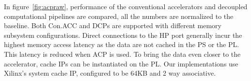 In figure~\ref{fig:acpraw}, performance of the conventional accelerators and decoupled computational pipelines are compared, all the numbers are normalized to the baseline.
Both Con.ACC and DCPs are supported with different memory subsystem configurations.
Direct connections to the HP port generally incur the highest memory access latency as
the data are not cached in the PS or the PL. This latency is reduced when ACP is used. To
bring the data even closer to the accelerator, cache IPs can be instantiated on the PL. Our implementations use Xilinx's system cache IP, configured to be 64KB and 2 way associative.


